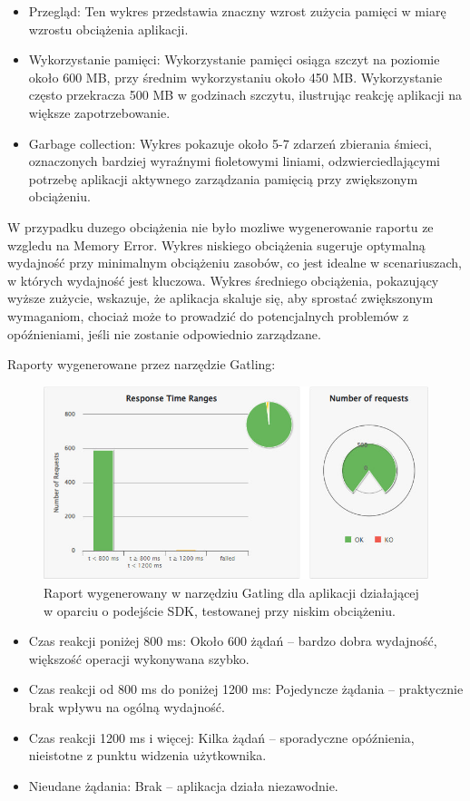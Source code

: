 \documentclass[runningheads,12pt]{llncs}
\begin{document}
\begin{itemize}
    \item Przegląd: Ten wykres przedstawia znaczny wzrost zużycia pamięci w miarę wzrostu obciążenia aplikacji.
    \item Wykorzystanie pamięci: Wykorzystanie pamięci osiąga szczyt na poziomie około 600 MB, przy średnim wykorzystaniu około 450 MB. Wykorzystanie często przekracza 500 MB w godzinach szczytu, ilustrując reakcję aplikacji na większe zapotrzebowanie.
    \item Garbage collection: Wykres pokazuje około 5-7 zdarzeń zbierania śmieci, oznaczonych bardziej wyraźnymi fioletowymi liniami, odzwierciedlającymi potrzebę aplikacji aktywnego zarządzania pamięcią przy zwiększonym obciążeniu.
\end{itemize}

W przypadku duzego obciążenia nie było mozliwe wygenerowanie raportu ze wzgledu na Memory Error.
Wykres niskiego obciążenia sugeruje optymalną wydajność przy minimalnym obciążeniu zasobów, co jest idealne w scenariuszach, w których wydajność jest kluczowa. Wykres średniego obciążenia, pokazujący wyższe zużycie, wskazuje, że aplikacja skaluje się, aby sprostać zwiększonym wymaganiom, chociaż może to prowadzić do potencjalnych problemów z opóźnieniami, jeśli nie zostanie odpowiednio zarządzane.

\newpage


Raporty wygenerowane przez narzędzie Gatling:

\begin{figure}
    \centering
    \includegraphics[width=0.8\linewidth]{images/sdk-gatling-low-graph.jpg}
    \caption{Raport wygenerowany w narzędziu Gatling dla aplikacji działającej w oparciu o podejście SDK, testowanej przy niskim obciążeniu.}
    \label{fig:low}
\end{figure}

\begin{itemize}
    \item Czas reakcji poniżej 800 ms: Około 600 żądań – bardzo dobra wydajność, większość operacji wykonywana szybko.
    \item Czas reakcji od 800 ms do poniżej 1200 ms: Pojedyncze żądania – praktycznie brak wpływu na ogólną wydajność.
    \item Czas reakcji 1200 ms i więcej: Kilka żądań – sporadyczne opóźnienia, nieistotne z punktu widzenia użytkownika.
    \item Nieudane żądania: Brak – aplikacja działa niezawodnie.
\end{itemize}
\end{document}
